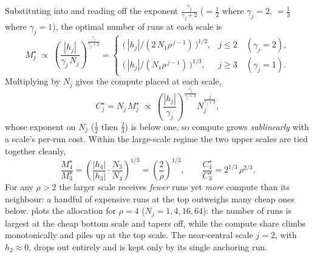Substituting into  and reading off the exponent $\tfrac{\gamma_j}{\gamma_j + 2}$ ($= \tfrac12$ where $\gamma_j = 2$, $= \tfrac13$ where $\gamma_j = 1$), the optimal number of runs at each scale is
%
\begin{equation}\label{eq:example-runs}
    M_j^\star \;\propto\; \left(\frac{|h_j|}{\gamma_j\, N_j}\right)^{\frac{\gamma_j}{\gamma_j + 2}}
    = \begin{cases}
        \bigl(\,|h_j| / (2\, N_1 \rho^{\,j-1})\,\bigr)^{1/2}, & j \le 2 \quad (\gamma_j = 2),\\[6pt]
        \bigl(\,|h_j| / (N_1 \rho^{\,j-1})\,\bigr)^{1/3}, & j \ge 3 \quad (\gamma_j = 1).
    \end{cases}
\end{equation}
%
Multiplying by $N_j$ gives the compute placed at each scale,
%
\begin{equation}\label{eq:opt-compute}
    C_j^\star = N_j\, M_j^\star \;\propto\; \left(\frac{|h_j|}{\gamma_j}\right)^{\frac{\gamma_j}{\gamma_j + 2}} N_j^{\frac{2}{\gamma_j + 2}},
\end{equation}
%
whose exponent on $N_j$ ($\tfrac12$ then $\tfrac23$) is below one, so compute grows \emph{sublinearly} with a scale's per-run cost. Within the large-scale regime the two upper scales are tied together cleanly,
%
\begin{equation}\label{eq:example-ratio}
    \frac{M_4^\star}{M_3^\star} = \left(\frac{|h_4|}{|h_3|}\cdot\frac{N_3}{N_4}\right)^{1/3} = \left(\frac{2}{\rho}\right)^{1/3},
    \qquad
    \frac{C_4^\star}{C_3^\star} = 2^{1/3}\,\rho^{2/3}.
\end{equation}
%
For any $\rho > 2$ the larger scale receives \emph{fewer} runs yet \emph{more} compute than its neighbour: a handful of expensive runs at the top outweighs many cheap ones below.  plots the allocation for $\rho = 4$ ($N_j = 1, 4, 16, 64$): the number of runs is largest at the cheap bottom scale and tapers off, while the compute share climbs monotonically and piles up at the top scale. The near-central scale $j = 2$, with $h_2 \approx 0$, drops out entirely and is kept only by its single anchoring run.

